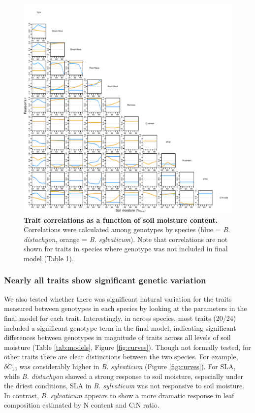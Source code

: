 \documentclass[jou,floatsintext]{apa6}
\begin{document}
\begin{figure}[!h]
\includegraphics[width=\textwidth]{../Figures/corsplots_byspecies} \caption{\textbf{Trait correlations as a function of soil moisture content.} Correlations were calculated among genotypes by species (blue = \emph{B. distachyon}, orange = \emph{B. sylvaticum}). Note that correlations are not shown for traits in species where genotype was not included in final model (Table 1).}\label{fig:cors}
\end{figure}

\hypertarget{nearly-all-traits-show-significant-genetic-variation}{%
\subsubsection{Nearly all traits show significant genetic variation}\label{nearly-all-traits-show-significant-genetic-variation}}

We also tested whether there was significant natural variation for the traits measured between genotypes in each species by looking at the parameters in the final model for each trait. Interestingly, in across species, most traits (20/24) included a significant genotype term in the final model, indicating significant differences between genotypes in magnitude of traits across all levels of soil moisture (Table \ref{tab:models}, Figure \ref{fig:curves}). Though not formally tested, for other traits there are clear distinctions between the two species. For example, \(\delta C_{13}\) was considerably higher in \emph{B. sylvaticum} (Figure \ref{fig:curves}). For SLA, while \emph{B. distachyon} showed a strong response to soil moisture, especially under the driest conditions, SLA in \emph{B. sylvaticum} was not responsive to soil moisture. In contrast, \emph{B. sylvaticum} appears to show a more dramatic response in leaf composition estimated by N content and C:N ratio.
\end{document}
